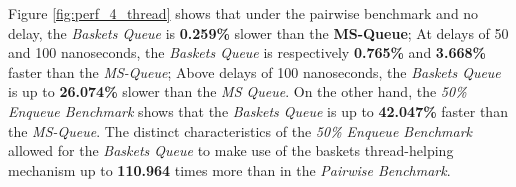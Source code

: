 Figure \ref{fig:perf_4_thread} shows that under the pairwise benchmark and no
delay, the \emph{Baskets Queue} is \textbf{0.259\%} slower than the \textbf{MS-Queue};
At delays of 50 and 100 nanoseconds, the \emph{Baskets Queue} is
respectively \textbf{0.765\%} and \textbf{3.668\%} faster than the
\emph{MS-Queue}; Above delays of 100 nanoseconds, the \emph{Baskets Queue} is
up to \textbf{26.074\%} slower than the \emph{MS Queue}. 
On the other hand, the \emph{50\% Enqueue Benchmark} shows that the
\emph{Baskets Queue} is up to \textbf{42.047\%} faster than the
\emph{MS-Queue}. The distinct characteristics of the \emph{50\% Enqueue
Benchmark} allowed for the \emph{Baskets Queue} to make use of the baskets
thread-helping mechanism up to \textbf{110.964} times more than in the
\emph{Pairwise Benchmark}.


